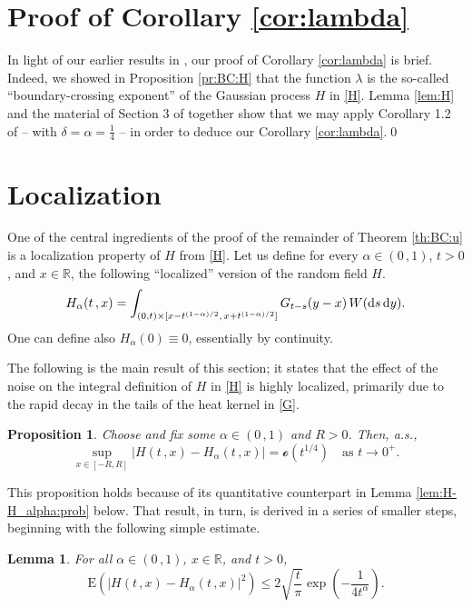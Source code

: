 \documentclass[reqno]{amsart}
\newcommand{\<}{\langle}
\renewcommand{\>}{\rangle}
\newcommand{\R}{\mathbb{R}}
\newcommand{\E}{\mathrm{E}}
\newcommand{\1}{\mathbb{1}}
\renewcommand{\d}{{\rm d}}
\renewcommand{\le}{\leqslant}
\newtheorem{proposition}[stat]{Proposition}
\newtheorem{lemma}[stat]{Lemma}
\theoremstyle{definition}
\numberwithin{equation}{section}
\begin{document}
\section{Proof of Corollary \ref{cor:lambda}}
In light of our earlier results in \cite{KL},
our proof of Corollary \ref{cor:lambda}
is brief. Indeed, we showed in Proposition \ref{pr:BC:H} that the function $\lambda$
is the so-called ``boundary-crossing exponent'' of the Gaussian
process $H$ in \eqref{H}. Lemma \ref{lem:H} and the material of
Section 3 of \cite{KL} together show that we may apply
Corollary 1.2 of \cite{KL} -- with $\delta=\alpha=\frac14$ -- in order
to deduce our Corollary \ref{cor:lambda}.\qed

\section{Localization}

One of the central ingredients of the proof of the remainder of
Theorem \ref{th:BC:u} is a localization property of $H$ from \eqref{H}.
Let us define for every $\alpha\in(0\,,1)$, $t>0$, and $x\in\R$,
the following ``localized'' version of the random field $H$.
\begin{equation}\label{H_alpha}
	H_\alpha(t\,,x) = \int_{(0,t)\times[x-t^{(1-\alpha)/2},\,x+t^{(1-\alpha)/2}]}
	G_{t-s}(y-x)\,W(\d s\,\d y).
\end{equation}
One can define also $H_\alpha(0)\equiv0$, essentially by continuity. 

The following is the main result of this section; it states that the effect of the noise
on the integral definition of $H$ in \eqref{H} is highly localized, primarily 
due to the rapid decay in the tails
of the heat kernel in \eqref{G}.

\begin{proposition}\label{pr:H-H_alpha:sup}
	Choose and fix some $\alpha\in(0\,,1)$ and $R>0$. Then, a.s.,
	\[
		\sup_{x\in[-R,R]}\left| H(t\,,x)-H_\alpha(t\,,x)\right| = \mathscr{o}(t^{1/4})
		\quad\text{as $t\to0^+$}.
	\]
\end{proposition}

This proposition holds because of its quantitative counterpart in Lemma 
\ref{lem:H-H_alpha:prob} below. That result, in turn, is derived in a series
of smaller steps, beginning with the following simple estimate.

\begin{lemma}\label{lem:H-H_alpha}
	For all $\alpha\in(0\,,1)$, $x\in\R$, and $t>0$,
	\[
		\E\left(|H(t\,,x) - H_\alpha(t\,,x)|^2\right)\le 
		2\sqrt{\frac{t}{\pi}} \exp\left( - \frac{1}{4t^\alpha}\right).
	\]
\end{lemma}
\end{document}
